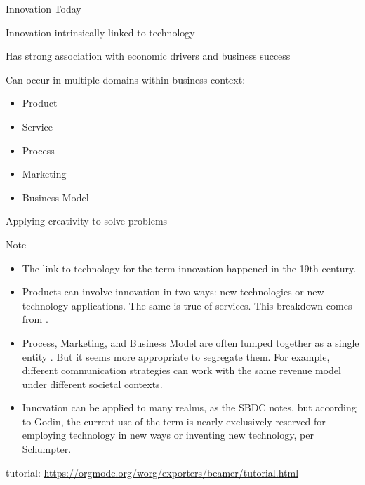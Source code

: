 \documentclass[10pt, presentation]{beamer}
\begin{document}
\begin{frame}[label={sec:org7325bcc}]{Innovation Today}
\begin{block}{\alert{Innovation} intrinsically linked to technology}
\end{block}
\begin{block}{Has strong association with economic drivers and business success}
\end{block}
\begin{block}{Can occur in multiple domains within business context:}
\begin{itemize}
\item Product
\item Service
\item Process
\item Marketing
\item Business Model
\end{itemize}
\end{block}
\begin{block}{Applying creativity to solve problems \parencite{godinInnovationContestedIdea2015}}
\end{block}


\begin{block}{Note}

\scriptsize
\begin{itemize}
\item The link to technology for the term innovation happened in the 19th century.
\item Products can involve innovation in two ways: new technologies or new technology applications. The same is true of services. This breakdown comes from \textcite{sbdcInnovationSmallBusiness2020}.
\item Process, Marketing, and Business Model are often lumped together as a single entity  \parencite{pisanoYouNeedInnovation2015}. But it seems more appropriate to segregate them. For example, different communication strategies can work with the same revenue model under different societal contexts.
\item Innovation can be applied to many realms, as the SBDC notes, but according to Godin, the current use of the term is nearly exclusively reserved for employing technology in new ways or inventing new technology, per Schumpter.
\normalsize
\end{itemize}
\end{block}

\begin{block}{tutorial: \url{https://orgmode.org/worg/exporters/beamer/tutorial.html}}
\end{block}


\end{frame}
\end{document}
